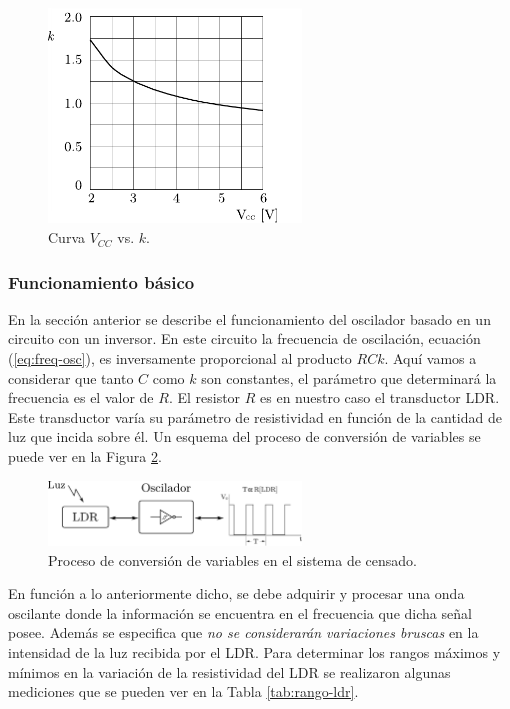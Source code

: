 \documentclass[11pt,a4paper,oneside]{article}
\begin{document}
\begin{figure}[h]
  \centering
  \includegraphics[width=0.6\textwidth]{images/constante-k}
  \caption{Curva $V_{CC}$ vs. $k$.}
  \label{fig:ctte-k}
\end{figure}

\subsubsection{Funcionamiento básico}
\label{sec:funcionamiento}

En la sección anterior se describe el funcionamiento del oscilador basado en un circuito con un inversor. En este circuito la frecuencia de oscilación, ecuación (\ref{eq:freq-osc}), es inversamente proporcional al producto $RCk$. Aquí vamos a considerar que tanto $C$ como $k$ son constantes, el parámetro que determinará la frecuencia es el valor de $R$. El resistor $R$ es en nuestro caso el transductor LDR. Este transductor varía su parámetro de resistividad en función de la cantidad de luz que incida sobre él. Un esquema del proceso de conversión de variables se puede ver en la Figura \ref{fig:proceso-sensor}.

\begin{figure}[h]
  \centering
  \includegraphics[width=0.6\textwidth]{images/proceso_sensor}
  \caption{Proceso de conversión de variables en el sistema de censado.}
  \label{fig:proceso-sensor}
\end{figure}

En función a lo anteriormente dicho, se debe adquirir y procesar una onda oscilante donde la información se encuentra en el frecuencia que dicha señal posee. Además se especifica que \emph{no se considerarán variaciones bruscas} en la intensidad de la luz recibida por el LDR. Para determinar los rangos máximos y mínimos en la variación de la resistividad del LDR se realizaron algunas mediciones que se pueden ver en la Tabla \ref{tab:rango-ldr}.
\end{document}
